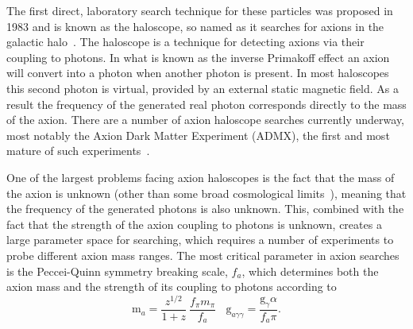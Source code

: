 \documentclass[preprint]{elsarticle}
\begin{document}
The first direct, laboratory search technique for these particles was proposed in 1983 and is known as the haloscope, so named as it searches for axions in the galactic halo~\cite{Sikivie83haloscope,Sikivie1985}. The haloscope is a technique for detecting axions via their coupling to photons. In what is known as the inverse Primakoff effect an axion will convert into a photon when another photon is present. In most haloscopes this second photon is virtual, provided by an external static magnetic field. As a result the frequency of the generated real photon corresponds directly to the mass of the axion. There are a number of axion haloscope searches currently underway, most notably the Axion Dark Matter Experiment (ADMX), the first and most mature of such experiments~\cite{ADMXaxions2010,ADMX2011}.

One of the largest problems facing axion haloscopes is the fact that the mass of the axion is unknown (other than some broad cosmological limits~\cite{Sikivie1983,Preskill1983}), meaning that the frequency of the generated photons is also unknown. This, combined with the fact that the strength of the axion coupling to photons is unknown, creates a large parameter space for searching, which requires a number of experiments to probe different axion mass ranges. The most critical parameter in axion searches is the Peccei-Quinn symmetry breaking scale, $f_a$, which determines both the axion mass and the strength of its coupling to photons according to
\begin{equation*}
	\text{m}_a=\frac{z^{1/2}}{1+z}~\frac{f_{\pi}m_{\pi}}{f_a}~~~~
	\text{g}_{a\gamma\gamma}=\frac{\text{g}_{\gamma}\alpha}{f_{a}\pi}.
\end{equation*}
\end{document}
